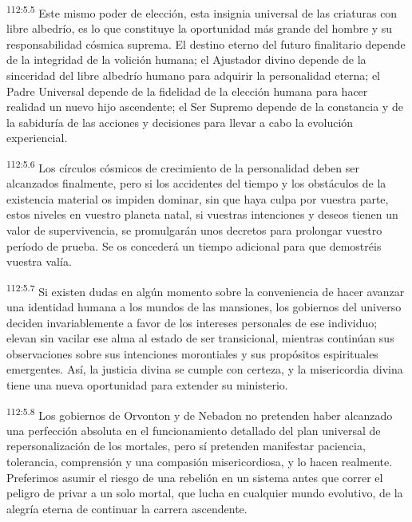\documentclass[twoside, 11pt]{book}
\begin{document}
\par
\textsuperscript{112:5.5} Este mismo poder de elección, esta insignia universal de las criaturas con libre albedrío, es lo que constituye la oportunidad más grande del hombre y su responsabilidad cósmica suprema. El destino eterno del futuro finalitario depende de la integridad de la volición humana; el Ajustador divino depende de la sinceridad del libre albedrío humano para adquirir la personalidad eterna; el Padre Universal depende de la fidelidad de la elección humana para hacer realidad un nuevo hijo ascendente; el Ser Supremo depende de la constancia y de la sabiduría de las acciones y decisiones para llevar a cabo la evolución experiencial.

\par
\textsuperscript{112:5.6} Los círculos cósmicos de crecimiento de la personalidad deben ser alcanzados finalmente, pero si los accidentes del tiempo y los obstáculos de la existencia material os impiden dominar, sin que haya culpa por vuestra parte, estos niveles en vuestro planeta natal, si vuestras intenciones y deseos tienen un valor de supervivencia, se promulgarán unos decretos para prolongar vuestro período de prueba. Se os concederá un tiempo adicional para que demostréis vuestra valía.

\par
\textsuperscript{112:5.7} Si existen dudas en algún momento sobre la conveniencia de hacer avanzar una identidad humana a los mundos de las mansiones, los gobiernos del universo deciden invariablemente a favor de los intereses personales de ese individuo; elevan sin vacilar ese alma al estado de ser transicional, mientras continúan sus observaciones sobre sus intenciones morontiales y sus propósitos espirituales emergentes. Así, la justicia divina se cumple con certeza, y la misericordia divina tiene una nueva oportunidad para extender su ministerio.

\par
\textsuperscript{112:5.8} Los gobiernos de Orvonton y de Nebadon no pretenden haber alcanzado una perfección absoluta en el funcionamiento detallado del plan universal de repersonalización de los mortales, pero sí pretenden manifestar paciencia, tolerancia, comprensión y una compasión misericordiosa, y lo hacen realmente. Preferimos asumir el riesgo de una rebelión en un sistema antes que correr el peligro de privar a un solo mortal, que lucha en cualquier mundo evolutivo, de la alegría eterna de continuar la carrera ascendente.
\end{document}
